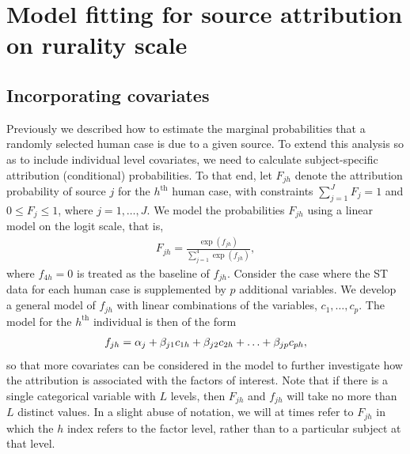 \documentclass[times, doublespace]{simauth}%
\begin{document}
\section{Model fitting for source attribution on rurality scale}

\subsection{Incorporating covariates}

Previously we described how to estimate the marginal probabilities that a randomly selected human case is due to a given source. To extend this analysis so as to include individual level covariates, we need to calculate subject-specific attribution (conditional) probabilities. To that end, let $F_{jh}$ denote the attribution probability of source $j$ for the $h^\textrm{th}$ human case, with constraints $\sum_{j=1}^J F_j =1$ and $0 \leq F_j \leq 1$, where $j=1, \ldots, J$. We model the probabilities $F_{jh}$ using a linear model on the logit scale, that is,  
\begin{align}
  F_{jh}  = \frac{\exp (f_{jh})}{\sum_{j=1}^4 \exp(f_{jh})},
  \label{capF}
\end{align}
where $f_{4h}=0$ is treated as the baseline of $f_{jh}$. Consider the case where the ST data for each human case is supplemented by $p$ additional variables. We develop a general model of $f_{jh}$ with linear combinations of the variables, $c_1, \ldots, c_p$. The model for the $h^\textrm{th}$ individual is then of the form
\begin{align}
f_{jh}  = \alpha_{j} + \beta_{j1} c_{1h} + \beta_{j2} c_{2h} + \ldots + \beta_{jp} c_{ph},  \notag
\end{align}
so that more covariates can be considered in the model to further investigate how the attribution is associated with the factors of interest. Note that if there is a single categorical variable with $L$ levels, then $F_{jh}$ and $f_{jh}$ will take no more than $L$ distinct values. In a slight abuse of notation, we will at times refer to $F_{jh}$ in which the $h$ index refers to the factor level, rather than to a particular subject at that level.
\end{document}
